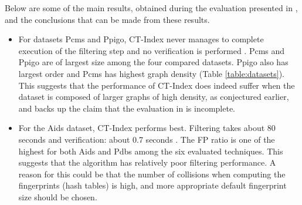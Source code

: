 \documentclass{l4proj}
\begin{document}
Below are some of the main results, obtained during the evaluation presented in \cite{foteini}, and the conclusions that can be made from these results.
\begin{itemize}
\item For datasets Pcms and Ppigo, CT-Index never manages to complete execution of the filtering step and no verification is performed \cite{foteini}. Pcms and Ppigo are of largest size among the four compared datasets. Ppigo also has largest order and Pcms has highest graph density (Table \ref{table:datasets}). This suggests that the performance of CT-Index does indeed suffer when the dataset is composed of larger graphs of high density, as conjectured earlier, and backs up the claim that the evaluation in \cite{ctindex} is incomplete.
\item For the Aids dataset, CT-Index performs best. Filtering takes about 80 seconds and verification: about 0.7 seconds \cite{foteini}. The FP ratio is one of the highest for both Aids and Pdbs among the six evaluated techniques. This suggests that the algorithm has relatively poor filtering performance. A reason for this could be that the number of collisions when computing the fingerprints (hash tables) is high, and more appropriate default fingerprint size should be chosen.
\end{itemize}
\end{document}
